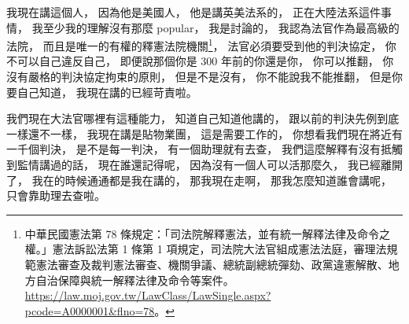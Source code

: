 \hypertarget{w06:cue:1683}{}我現在講這個人，
\hypertarget{w06:cue:1684}{}因為他是美國人，
\hypertarget{w06:cue:1685}{}他是講英美法系的，
\hypertarget{w06:cue:1686}{}正在大陸法系這件事情，
\hypertarget{w06:cue:1687}{}我至少我的理解沒有那麼 popular，
\hypertarget{w06:cue:1688}{}我是討論的，
\hypertarget{w06:cue:1689}{}我認為法官作為最高級的法院，
\hypertarget{w06:cue:1690}{}而且是唯一的有權的釋憲法院機關\footnote{中華民國憲法第 78 條規定：「司法院解釋憲法，並有統一解釋法律及命令之權。」憲法訴訟法第 1 條第 1 項規定，司法院大法官組成憲法法庭，審理法規範憲法審查及裁判憲法審查、機關爭議、總統副總統彈劾、政黨違憲解散、地方自治保障與統一解釋法律及命令等案件。\url{https://law.moj.gov.tw/LawClass/LawSingle.aspx?pcode=A0000001&flno=78}。}，
\hypertarget{w06:cue:1691}{}法官必須要受到他的判決協定，
\hypertarget{w06:cue:1692}{}你不可以自己違反自己，
\hypertarget{w06:cue:1693}{}即便說那個你是 300 年前的你還是你，
\hypertarget{w06:cue:1694}{}你可以推翻，
\hypertarget{w06:cue:1695}{}你沒有嚴格的判決協定拘束的原則，
\hypertarget{w06:cue:1696}{}但是不是沒有，
\hypertarget{w06:cue:1697}{}你不能說我不能推翻，
\hypertarget{w06:cue:1698}{}但是你要自己知道，
\hypertarget{w06:cue:1699}{}我現在講的已經苛責啦。

\hypertarget{w06:cue:1700}{}我們現在大法官哪裡有這種能力，
\hypertarget{w06:cue:1701}{}知道自己知道他講的，
\hypertarget{w06:cue:1702}{}跟以前的判決先例到底一樣還不一樣，
\hypertarget{w06:cue:1703}{}我現在講是貼物業團，
\hypertarget{w06:cue:1704}{}這是需要工作的，
\hypertarget{w06:cue:1705}{}你想看我們現在將近有一千個判決，
\hypertarget{w06:cue:1706}{}是不是每一判決，
\hypertarget{w06:cue:1707}{}有一個助理就有去查，
\hypertarget{w06:cue:1708}{}我們這麼解釋有沒有抵觸到監情講過的話，
\hypertarget{w06:cue:1709}{}現在誰還記得呢，
\hypertarget{w06:cue:1710}{}因為沒有一個人可以活那麼久，
\hypertarget{w06:cue:1711}{}我已經離開了，
\hypertarget{w06:cue:1712}{}我在的時候通通都是我在講的，
\hypertarget{w06:cue:1713}{}那我現在走啊，
\hypertarget{w06:cue:1714}{}那我怎麼知道誰會講呢，
\hypertarget{w06:cue:1715}{}只會靠助理去查啦。

